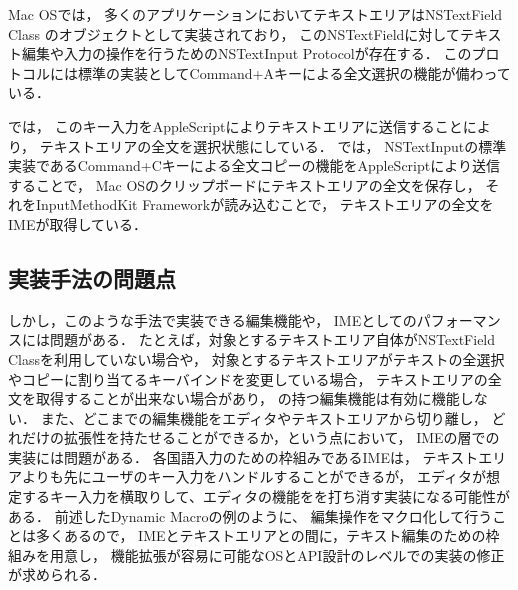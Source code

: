 Mac OSでは，
多くのアプリケーションにおいてテキストエリアはNSTextField Class のオブジェクトとして実装されており，
このNSTextFieldに対してテキスト編集や入力の操作を行うためのNSTextInput Protocolが存在する．
このプロトコルには標準の実装としてCommand+Aキーによる全文選択の機能が備わっている．

{\system}では，
このキー入力をAppleScriptによりテキストエリアに送信することにより，
テキストエリアの全文を選択状態にしている．
%
{\system}では，
NSTextInputの標準実装であるCommand+Cキーによる全文コピーの機能をAppleScriptにより送信することで，
Mac OSのクリップボードにテキストエリアの全文を保存し，
それをInputMethodKit Frameworkが読み込むことで，
テキストエリアの全文をIMEが取得している．
%

\subsection{実装手法の問題点}

しかし，このような手法で実装できる編集機能や，
IMEとしてのパフォーマンスには問題がある．
たとえば，対象とするテキストエリア自体がNSTextField Classを利用していない場合や，
対象とするテキストエリアがテキストの全選択やコピーに割り当てるキーバインドを変更している場合，
テキストエリアの全文を取得することが出来ない場合があり，
{\system}の持つ編集機能は有効に機能しない．
%
また、どこまでの編集機能をエディタやテキストエリアから切り離し，
どれだけの拡張性を持たせることができるか，という点において，
IMEの層での実装には問題がある．
各国語入力のための枠組みであるIMEは，
テキストエリアよりも先にユーザのキー入力をハンドルすることができるが，
エディタが想定するキー入力を横取りして、エディタの機能をを打ち消す実装になる可能性がある．
%
前述したDynamic Macroの例のように、
編集操作をマクロ化して行うことは多くあるので，
IMEとテキストエリアとの間に，テキスト編集のための枠組みを用意し，
機能拡張が容易に可能なOSとAPI設計のレベルでの実装の修正が求められる．

